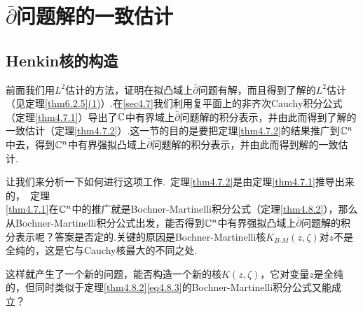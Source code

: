 \section{$\bar{\partial}$问题解的一致估计\label{sec6.7.1}}
\subsection{Henkin核的构造}
前面我们用$L^2$估计的方法，证明在拟凸域上$\bar{\partial}$问题有解，而且得到了解的$L^2$估计（见定理\ref{thm6.2.5}\hyperlink{6.2.5}{(1)}）.在\ref{sec4.7}我们利用复平面上的非齐次Cauchy积分公式（定理\ref{thm4.7.1}）导出了$\mathbb C$中有界域上$\bar{\partial}$问题解的积分表示，并由此而得到了解的一致估计（定理\ref{thm4.7.2}）.这一节的目的是要把定理\ref{thm4.7.2}的结果推广到$\mathbb C^n$中去，得到$\mathbb C^n$中有界强拟凸域上$\bar{\partial}$问题解的积分表示，并由此而得到解的一致估计.

让我们来分析一下如何进行这项工作.\,
定理\ref{thm4.7.2}是由定理\ref{thm4.7.1}推导出来的，\,
定理\\
\ref{thm4.7.1}在$\mathbb C^n$中的推广就是Bochner-Martinelli积分公式（定理\ref{thm4.8.2}），那么从Bochner-Martinelli积分公式出发，能否得到$\mathbb C^n$中有界强拟凸域上$\bar{\partial}$问题解的积分表示呢？答案是否定的.关键的原因是Bochner-Martinelli核$K_{B\text{-}M}(z,\zeta)$对$z$不是全纯的，这是它与Cauchy核最大的不同之处.

这样就产生了一个新的问题，能否构造一个新的核$K(z,\zeta)$，它对变量$z$是全纯的，但同时类似于定理\ref{thm4.8.2}\eqref{eq4.8.3}的Bochner-Martinelli积分公式又能成立？

